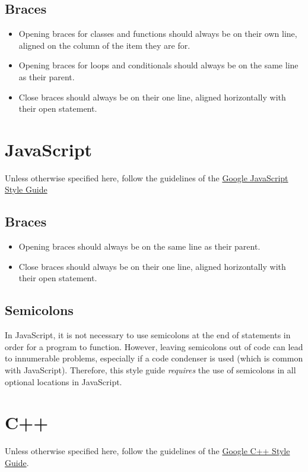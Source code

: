 \documentclass[12pt,letter]{memoir} %
\begin{document}
		\subsection{Braces}
			\begin{itemize}
				\item Opening braces for classes and functions should always be
					on their own line, aligned on the column of the item they
					are for.
				\item Opening braces for loops and conditionals should always be
					on the same line as their parent.
				\item Close braces should always be on their one line, aligned
					horizontally with their open statement.
			\end{itemize}
	\section{JavaScript}
		Unless otherwise specified here, follow the guidelines of the
		\href{http://google-styleguide.googlecode.com/svn/trunk/javascriptguide.xml}{Google JavaScript Style Guide}
		\subsection{Braces}
			\begin{itemize}
				\item Opening braces should always be on the same line as their
					parent.
				\item Close braces should always be on their one line, aligned
					horizontally with their open statement.
			\end{itemize}
		\subsection{Semicolons}
			In JavaScript, it is not necessary to use semicolons at the end of
			statements in order for a program to function. However, leaving
			semicolons out of code can lead to innumerable problems, especially
			if a code condenser is used (which is common with JavaScript).
			Therefore, this style guide \emph{requires} the use of semicolons in
			all optional locations in JavaScript.
	\section{C++}
		Unless otherwise specified here, follow the guidelines of the
		\href{http://google-styleguide.googlecode.com/svn/trunk/cppguide.xml}{Google C++ Style Guide}.
\end{document}
